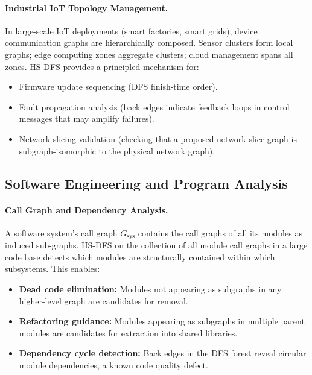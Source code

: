 ﻿\documentclass[12pt,a4paper]{article}
\theoremstyle{plain}
\theoremstyle{definition}
\theoremstyle{remark}
\begin{document}
	\paragraph{Industrial IoT Topology Management.}
	In large-scale IoT deployments (smart factories, smart grids), device
	communication graphs are hierarchically composed.  Sensor clusters form
	local graphs; edge computing zones aggregate clusters; cloud management
	spans all zones.  HS-DFS provides a principled mechanism for:
	\begin{itemize}
		\item Firmware update sequencing (DFS finish-time order).
		\item Fault propagation analysis (back edges indicate feedback loops
		in control messages that may amplify failures).
		\item Network slicing validation (checking that a proposed network
		slice graph is subgraph-isomorphic to the physical network graph).
	\end{itemize}
	
	\subsection{Software Engineering and Program Analysis}
	\label{sec:software}
	
	\paragraph{Call Graph and Dependency Analysis.}
	A software system's call graph $G_{\text{sys}}$ contains the call graphs of
	all its modules as induced sub-graphs.  HS-DFS on the collection of all
	module call graphs in a large code base detects which modules are structurally
	contained within which subsystems.  This enables:
	\begin{itemize}
		\item \textbf{Dead code elimination:} Modules not appearing as subgraphs in
		any higher-level graph are candidates for removal.
		\item \textbf{Refactoring guidance:} Modules appearing as subgraphs in
		multiple parent modules are candidates for extraction into shared
		libraries.
		\item \textbf{Dependency cycle detection:} Back edges in the DFS forest
		reveal circular module dependencies, a known code quality defect.
	\end{itemize}
	
\end{document}
